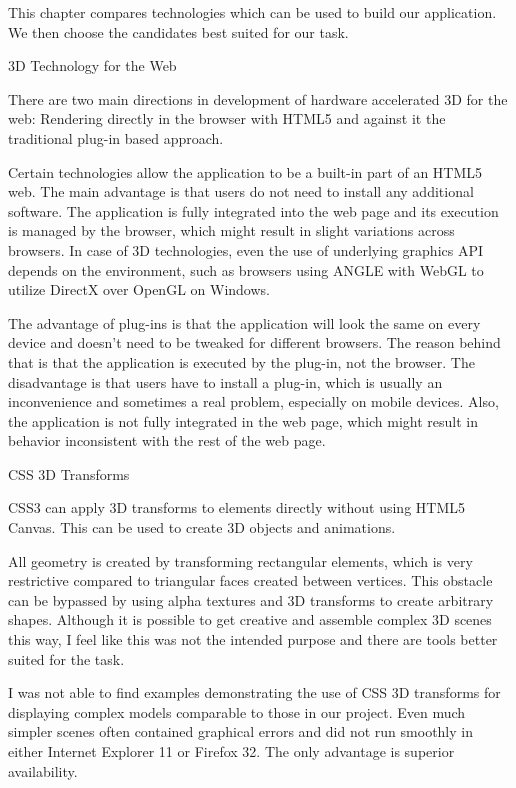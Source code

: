 This chapter compares technologies which can be used to build our application. We then choose the candidates best suited for our task.

\sec 3D Technology for the Web

There are two main directions in development of hardware accelerated 3D for the web: Rendering directly in the browser with HTML5 and against it the traditional plug-in based approach.

Certain technologies allow the application to be a built-in part of an HTML5 web. The main advantage is that users do not need to install any additional software. The application is fully integrated into the web page and its execution is managed by the browser, which might result in slight variations across browsers. In case of 3D technologies, even the use of underlying graphics API depends on the environment, such as browsers using ANGLE with WebGL to utilize DirectX over OpenGL on Windows.

The advantage of plug-ins is that the application will look the same on every device and doesn’t need to be tweaked for different browsers. The reason behind that is that the application is executed by the plug-in, not the browser. The disadvantage is that users have to install a plug-in, which is usually an inconvenience and sometimes a real problem, especially on mobile devices. Also, the application is not fully integrated in the web page, which might result in behavior inconsistent with the rest of the web page.

\secc CSS 3D Transforms

CSS3 can apply 3D transforms to elements directly without using HTML5 Canvas. This can be used to create 3D objects and animations.

All geometry is created by transforming rectangular elements, which is very restrictive compared to triangular faces created between vertices. This obstacle can be bypassed by using alpha textures and 3D transforms to create arbitrary shapes. Although it is possible to get creative and assemble complex 3D scenes this way, I feel like this was not the intended purpose and there are tools better suited for the task.

I was not able to find examples demonstrating the use of CSS 3D transforms for displaying complex models comparable to those in our project. Even much simpler scenes often contained graphical errors and did not run smoothly in either Internet Explorer 11 or Firefox 32. The only advantage is superior availability.

